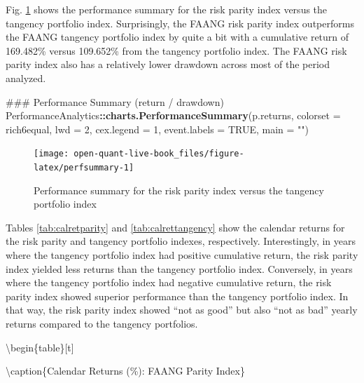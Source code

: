 \documentclass[]{book}
\newenvironment{Shaded}{\begin{snugshade}}{\end{snugshade}}
\newcommand{\KeywordTok}[1]{\textcolor[rgb]{0.13,0.29,0.53}{\textbf{#1}}}
\newcommand{\DataTypeTok}[1]{\textcolor[rgb]{0.13,0.29,0.53}{#1}}
\newcommand{\DecValTok}[1]{\textcolor[rgb]{0.00,0.00,0.81}{#1}}
\newcommand{\StringTok}[1]{\textcolor[rgb]{0.31,0.60,0.02}{#1}}
\newcommand{\OtherTok}[1]{\textcolor[rgb]{0.56,0.35,0.01}{#1}}
\newcommand{\OperatorTok}[1]{\textcolor[rgb]{0.81,0.36,0.00}{\textbf{#1}}}
\newcommand{\NormalTok}[1]{#1}
\theoremstyle{definition}
\theoremstyle{definition}
\theoremstyle{definition}
\theoremstyle{remark}
\begin{document}
Fig. \ref{fig:perfsummary} shows the performance summary for the risk
parity index versus the tangency portfolio index. Surprisingly, the
FAANG risk parity index outperforms the FAANG tangency portfolio index
by quite a bit with a cumulative return of 169.482\% versus 109.652\%
from the tangency portfolio index. The FAANG risk parity index also has
a relatively lower drawdown across most of the period analyzed.

\begin{Shaded}
\begin{Highlighting}[]
\NormalTok{### Performance Summary (return / drawdown)}
\NormalTok{PerformanceAnalytics}\OperatorTok{::}\KeywordTok{charts.PerformanceSummary}\NormalTok{(p.returns, }
  \DataTypeTok{colorset =}\NormalTok{ rich6equal, }\DataTypeTok{lwd =} \DecValTok{2}\NormalTok{, }\DataTypeTok{cex.legend =} \DecValTok{1}\NormalTok{, }\DataTypeTok{event.labels =} \OtherTok{TRUE}\NormalTok{, }
  \DataTypeTok{main =} \StringTok{""}\NormalTok{)}
\end{Highlighting}
\end{Shaded}

\begin{figure}[H]

{\centering \texttt{[image: open-quant-live-book\_files/figure-latex/perfsummary-1]} 

}

\caption{Performance summary for the risk parity index versus the tangency portfolio index}\label{fig:perfsummary}
\end{figure}

Tables \ref{tab:calretparity} and \ref{tab:calrettangency} show the
calendar returns for the risk parity and tangency portfolio indexes,
respectively. Interestingly, in years where the tangency portfolio index
had positive cumulative return, the risk parity index yielded less
returns than the tangency portfolio index. Conversely, in years where
the tangency portfolio index had negative cumulative return, the risk
parity index showed superior performance than the tangency portfolio
index. In that way, the risk parity index showed ``not as good'' but
also ``not as bad'' yearly returns compared to the tangency portfolios.

\textbackslash{}begin\{table\}{[}t{]}

\textbackslash{}caption\{\label{tab:calretparity}Calendar Returns (\%):
FAANG Parity Index\} \centering
\end{document}
